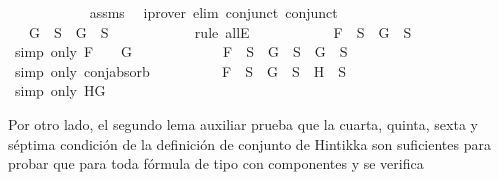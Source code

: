 \begin{isabellebody}
\ \ \ \ \ \ \ \ \ \ \isamarkupfalse%
\ assms\ \isamarkupfalse%
\ {\isacharparenleft}iprover\ elim{\isacharcolon}\ conjunct{}\ conjunct{}{\isacharparenright}\isanewline
\ \ \ \ \ \ \ \ \isamarkupfalse%
\ \isamarkupfalse%
\ {\isachardoublequoteopen}\isactrlbold {\isasymnot}\ {\isacharparenleft}\isactrlbold {\isasymnot}\ G{\isacharparenright}\ {\isasymin}\ S\ {\isasymlongrightarrow}\ G\ {\isasymin}\ S{\isachardoublequoteclose}\isanewline
\ \ \ \ \ \ \ \ \ \ \isamarkupfalse%
\ {\isacharparenleft}rule\ allE{\isacharparenright}\isanewline
\ \ \ \ \ \ \ \ \isamarkupfalse%
\ \isamarkupfalse%
\ {\isachardoublequoteopen}F\ {\isasymin}\ S\ {\isasymlongrightarrow}\ G\ {\isasymin}\ S{\isachardoublequoteclose}\isanewline
\ \ \ \ \ \ \ \ \ \ \isamarkupfalse%
\ {\isacharparenleft}simp\ only{\isacharcolon}\ {\isacartoucheopen}F\ {\isacharequal}\ \isactrlbold {\isasymnot}\ {\isacharparenleft}\isactrlbold {\isasymnot}\ G{\isacharparenright}{\isacartoucheclose}{\isacharparenright}\ \isanewline
\ \ \ \ \ \ \ \ \isamarkupfalse%
\ \isamarkupfalse%
\ {\isachardoublequoteopen}F\ {\isasymin}\ S\ {\isasymlongrightarrow}\ G\ {\isasymin}\ S\ {\isasymand}\ G\ {\isasymin}\ S{\isachardoublequoteclose}\isanewline
\ \ \ \ \ \ \ \ \ \ \isamarkupfalse%
\ {\isacharparenleft}simp\ only{\isacharcolon}\ conj{\isacharunderscore}absorb{\isacharparenright}\isanewline
\ \ \ \ \ \ \ \ \isamarkupfalse%
\ {\isachardoublequoteopen}F\ {\isasymin}\ S\ {\isasymlongrightarrow}\ G\ {\isasymin}\ S\ {\isasymand}\ H\ {\isasymin}\ S{\isachardoublequoteclose}\isanewline
\ \ \ \ \ \ \ \ \ \ \isamarkupfalse%
\ {\isacharparenleft}simp\ only{\isacharcolon}\ {\isacartoucheopen}H{\isacharequal}G{\isacartoucheclose}{\isacharparenright}\isanewline
\ \ \ \ \ \ \isamarkupfalse%
\isanewline
\ \ \ \ \isamarkupfalse%
\isanewline
\ \ \isamarkupfalse%
\isanewline
{}\isamarkupfalse%
%
\endisatagproof
{\isafoldproof}%
%
\isadelimproof
%
\endisadelimproof
%
\begin{isamarkuptext}%
Por otro lado, el segundo lema auxiliar prueba que la cuarta, quinta, sexta
  y séptima condición de la definición de conjunto de Hintikka son suficientes para
  probar que para toda fórmula de tipo \isa{{\isasymbeta}} con componentes  y  se verifica 

\end{isamarkuptext}
\end{isabellebody}
